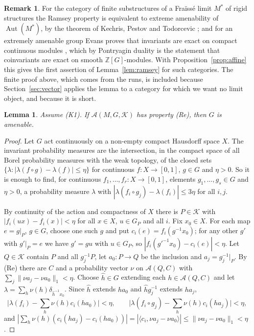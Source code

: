 \documentclass[11pt,a4paper]{article}
\newtheorem{lemma}[theorem]{Lemma}
\theoremstyle{definition}
\newtheorem{remark}[theorem]{Remark}
\newcommand{\A}{\mathcal{A}}
\newcommand{\K}{\mathcal{K}}
\newcommand{\Z}{\mathbb{Z}}
\newcommand{\Aut}{\operatorname{Aut}}
\begin{document}
\begin{remark}\label{rem:evans}
For the category of finite substructures of a Fra\"iss\'e limit $M^*$ of
rigid structures the Ramsey property is equivalent to extreme amenability of
$\Aut(M^*)$, by the theorem of Kechris, Pestov and Todorcevic
\cite[Theorem~4.8]{KPT}; and for an extremely amenable group Evans proves
that invariants are exact on compact continuous modules
\cite[Lemma~3.7\,(i)]{Ev}, which by Pontryagin duality is the statement that
coinvariants are exact on smooth $\Z[G]$-modules. With
Proposition~\ref{prop:affine} this gives the first assertion of
Lemma~\ref{lem:ramsey} for such categories. The finite proof above, which
comes from the runs, is included because Section~\ref{sec:vector} applies
the lemma to a category for which we want no limit object, and because it
is short.
\end{remark}

\begin{lemma}\label{lem:Re}
Assume \textup{(K1)}. If $\A(M,G,\K)$ has property \textup{(Re)}, then $G$
is amenable.
\end{lemma}

\begin{proof}
Let $G$ act continuously on a non-empty compact Hausdorff space $X$. The
invariant probability measures are the intersection, in the compact space
of all Borel probability measures with the weak topology, of the closed
sets $\{\lambda:|\lambda(f\circ g)-\lambda(f)|\le\eta\}$ for continuous
$f\colon X\to[0,1]$, $g\in G$ and $\eta>0$. So it is enough to find, for
continuous $f_1,\dots,f_r\colon X\to[0,1]$, elements $g_1,\dots,g_s\in G$ and
$\eta>0$, a probability measure $\lambda$ with
$|\lambda(f_i\circ g_j)-\lambda(f_i)|\le3\eta$ for all $i,j$.

By continuity of the action and compactness of $X$ there is $P\in\K$ with
$|f_i(ux)-f_i(x)|<\eta$ for all $x\in X$, $u\in G_P$ and all $i$. Fix
$x_0\in X$. For each map $e=g|_P$, $g\in G$, choose one such $g$ and put
$c_i(e)=f_i(g^{-1}x_0)$; for any other $g'$ with $g'|_P=e$ we have
$g'=gu$ with $u\in G_P$, so $|f_i(g'^{-1}x_0)-c_i(e)|<\eta$. Let $Q\in\K$
contain $P$ and all $g_j^{-1}P$, let $a_0\colon P\to Q$ be the inclusion and
$a_j=g_j^{-1}|_P$. By \textup{(Re)} there are $C$ and a probability vector
$\nu$ on $\A(Q,C)$ with $\sum_j\|\nu a_j-\nu a_0\|_1<\eta$. Choose
$\hat h\in G$ extending each $h\in\A(Q,C)$ and let
$\lambda=\sum_h\nu(h)\delta_{\hat h^{-1}x_0}$. Since $\hat h$ extends $ha_0$
and $\hat hg_j^{-1}$ extends $ha_j$,
\[
 \bigl|\lambda(f_i)-\textstyle\sum_h\nu(h)c_i(ha_0)\bigr|<\eta,\qquad
 \bigl|\lambda(f_i\circ g_j)-\textstyle\sum_h\nu(h)c_i(ha_j)\bigr|<\eta ,
\]
and $|\sum_h\nu(h)(c_i(ha_j)-c_i(ha_0))|=|\langle c_i,\nu a_j-\nu
a_0\rangle|\le\|\nu a_j-\nu a_0\|_1<\eta$.
\end{proof}
\end{document}
